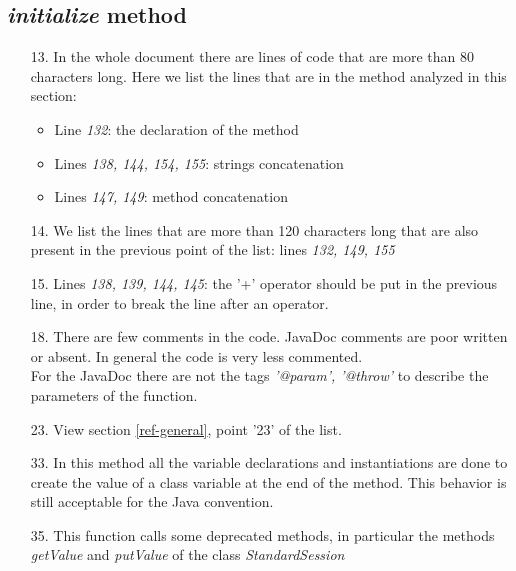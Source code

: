 \subsection{\textit{initialize} method}

\begin{itemize}
        \item[13.] In the whole document there are lines of code that are more than 80 characters long. 
        \newline
        Here we list the lines that are in the method analyzed in this section:
            \begin{itemize}
                \item Line \textit{132}: the declaration of the method
                \item Lines \textit{138, 144, 154, 155}: strings concatenation
                \item Lines \textit{147, 149}: method concatenation
            \end{itemize}
    \item[14.] 
    We list the lines that are more than 120 characters long that are also present in the previous point of the list: lines \textit{132, 149, 155}
    \item[15.] Lines \textit{138, 139, 144, 145}: the '+' operator should be put in the previous line, in order to break the line after an operator.
    \item[18.] There are few comments in the code. JavaDoc comments are poor written or absent. In general the code is very less commented.\\
    For the JavaDoc there are not the tags \textit{'@param', '@throw'} to describe the parameters of the function.
    \item[23.] View section \ref{ref-general}, point '23' of the list.
    \item[33.] In this method all the variable declarations and instantiations are done to create the value of a class variable at the end of the method. This behavior is still acceptable for the Java convention.
    \item[35.] This function calls some deprecated methods, in particular the methods \textit{getValue} and \textit{putValue} of the class \textit{StandardSession}
\end{itemize}